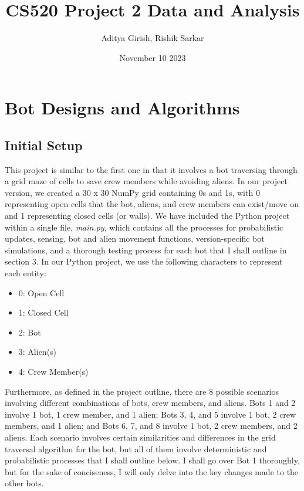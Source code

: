 \documentclass[11pt]{article}
\title{CS520 Project 2 Data and Analysis}
\author{Aditya Girish, Rishik Sarkar}
\date{November 10 2023}
\begin{document}
\maketitle

\section{Bot Designs and Algorithms}

\subsection{Initial Setup}

This project is similar to the first one in that it involves a bot traversing through a grid maze of cells to save crew members while avoiding aliens. In our project version, we created a 30 x 30 NumPy grid containing 0s and 1s, with 0 representing open cells that the bot, aliens, and crew members can exist/move on and 1 representing closed cells (or walls). We have included the Python project within a single file, \emph{main.py}, which contains all the processes for probabilistic updates, sensing, bot and alien movement functions, version-specific bot simulations, and a thorough testing process for each bot that I shall outline in section 3. In our Python project, we use the following characters to represent each entity:

\begin{itemize}
    \item 0: Open Cell
    \item 1: Closed Cell
    \item 2: Bot
    \item 3: Alien(s)
    \item 4: Crew Member(s)
\end{itemize}

Furthermore, as defined in the project outline, there are 8 possible scenarios involving different combinations of bots, crew members, and aliens. Bots 1 and 2 involve 1 bot, 1 crew member, and 1 alien; Bots 3, 4, and 5 involve 1 bot, 2 crew members, and 1 alien; and Bots 6, 7, and 8 involve 1 bot, 2 crew members, and 2 aliens. Each scenario involves certain similarities and differences in the grid traversal algorithm for the bot, but all of them involve deterministic and probabilistic processes that I shall outline below. I shall go over Bot 1 thoroughly, but for the sake of conciseness, I will only delve into the key changes made to the other bots.
\end{document}
